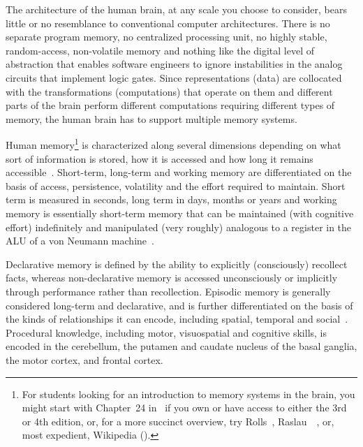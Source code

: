 
The architecture of the human brain, at any scale you choose to consider, bears little or no resemblance to conventional computer architectures. There is no separate program memory, no centralized processing unit, no highly stable, random-access, non-volatile memory and nothing like the digital level of abstraction that enables software engineers to ignore instabilities in the analog circuits that implement logic gates. Since representations (data) are collocated with the transformations (computations) that operate on them and different parts of the brain perform different computations requiring different types of memory, the human brain has to support multiple memory systems.

Human memory\footnote{%
%  
  For students looking for an introduction to memory systems in the brain, you might start with Chapter~24 in~\cite{Bearetal2015} if you own or have access to either the 3rd or 4th edition, or, for a more succinct overview, try Rolls~\cite{RollsARP-01}, Raslau~\etal{}~\cite{RaslauetalAJN-15,RaslauetalAJN-15}, or, most expedient, Wikipedia ({}).} 
%
is characterized along several dimensions depending on what sort of information is stored, how it is accessed and how long it remains accessible~\cite{CowanPBR-08}. Short-term, long-term and working memory are differentiated on the basis of access, persistence, volatility and the effort required to maintain. Short term is measured in seconds, long term in days, months or years and working memory is essentially short-term memory that can be maintained (with cognitive effort) indefinitely and manipulated (very roughly) analogous to a register in the ALU of a von Neumann machine~\cite{BaddeleyQJoEP-86}.

Declarative memory is defined by the ability to explicitly (consciously) recollect facts, whereas non-declarative memory is accessed unconsciously or implicitly through performance rather than recollection. Episodic memory is generally considered long-term and declarative, and is further differentiated on the basis of the kinds of relationships it can encode, including spatial, temporal and social~\cite{StachenfeldetalNATURE-17,RueckemannandBuffaloNATURE-2017,KumaranandMaguireJoN-05,NealandEichenbaum1993}. Procedural knowledge, including motor, visuospatial and cognitive skills, is encoded in the cerebellum, the putamen and caudate nucleus of the basal ganglia, the motor cortex, and frontal cortex.


